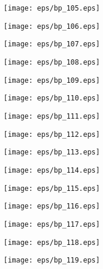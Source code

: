 \documentclass{book}
\begin{document}
	\clearpage\begin{figure}[p]
    \centering
	\texttt{[image: eps/bp\_105.eps]}
	\end{figure}
	\clearpage\begin{figure}[p]
    \centering
	\texttt{[image: eps/bp\_106.eps]}
	\end{figure}
	\clearpage\begin{figure}[p]
    \centering
	\texttt{[image: eps/bp\_107.eps]}
	\end{figure}
	\clearpage\begin{figure}[p]
    \centering
	\texttt{[image: eps/bp\_108.eps]}
	\end{figure}
	\clearpage\begin{figure}[p]
    \centering
	\texttt{[image: eps/bp\_109.eps]}
	\end{figure}
	\clearpage\begin{figure}[p]
    \centering
	\texttt{[image: eps/bp\_110.eps]}
	\end{figure}
	\clearpage\begin{figure}[p]
    \centering
	\texttt{[image: eps/bp\_111.eps]}
	\end{figure}
	\clearpage\begin{figure}[p]
    \centering
	\texttt{[image: eps/bp\_112.eps]}
	\end{figure}
	\clearpage\begin{figure}[p]
    \centering
	\texttt{[image: eps/bp\_113.eps]}
	\end{figure}
	\clearpage\begin{figure}[p]
    \centering
	\texttt{[image: eps/bp\_114.eps]}
	\end{figure}
	\clearpage\begin{figure}[p]
    \centering
	\texttt{[image: eps/bp\_115.eps]}
	\end{figure}
	\clearpage\begin{figure}[p]
    \centering
	\texttt{[image: eps/bp\_116.eps]}
	\end{figure}
	\clearpage\begin{figure}[p]
    \centering
	\texttt{[image: eps/bp\_117.eps]}
	\end{figure}
	\clearpage\begin{figure}[p]
    \centering
	\texttt{[image: eps/bp\_118.eps]}
	\end{figure}
	\clearpage\begin{figure}[p]
    \centering
	\texttt{[image: eps/bp\_119.eps]}
	\end{figure}
\end{document}
